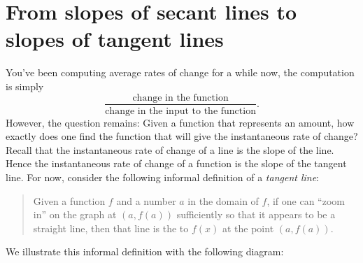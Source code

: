 \PassOptionsToClass{tikzexport}{ximera}\nonstopmode\documentclass{ximera}
\begin{document}
\section{From slopes of secant lines to slopes of tangent lines}

You've been computing average rates of change for a while now, the
computation is simply
\[
\frac{\text{change in the function}}{\text{change in the input to the
    function}}.
\]
However, the question remains: Given a function that represents an
amount, how exactly does one find the function that will give the
instantaneous rate of change? Recall that the instantaneous rate of change
of a line is the slope of the line.  Hence the instantaneous rate of
change of a function is the slope of the tangent line. For now,
consider the following informal definition of a \textit{tangent line}:
\begin{quote}
Given a function $f$ and a number $a$ in the domain of $f$, if one can ``zoom in''
on the graph at $(a, f(a))$ sufficiently so that it appears to be a straight line,
then that line is the  to $f(x)$ at the point $(a,f(a))$.
\end{quote}
We illustrate this informal definition with the following diagram:
\end{document}
